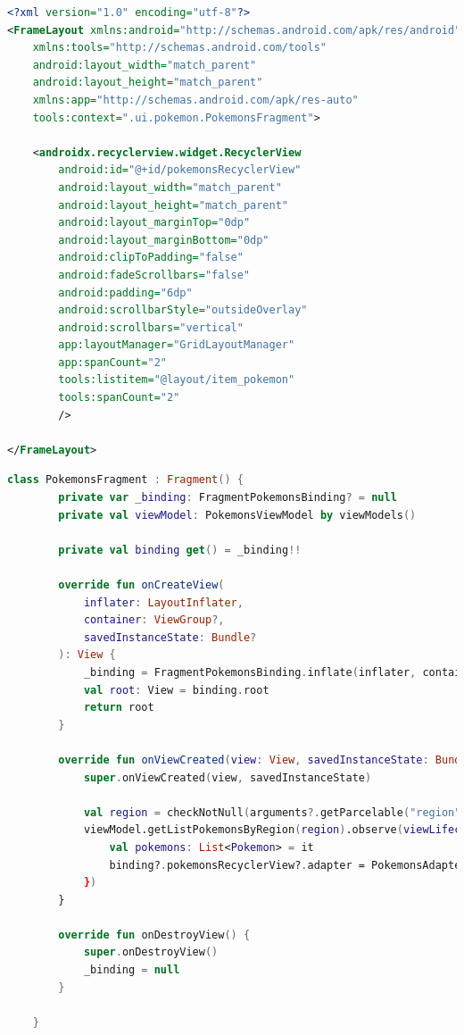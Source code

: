 \documentclass[a4paper, 12pt]{article}
\begin{document}
\begin{lstlisting}[caption={Pokemons Fragment Layout.}, label={code:xml_pokemons_fragment}, language=XML]
<?xml version="1.0" encoding="utf-8"?>
<FrameLayout xmlns:android="http://schemas.android.com/apk/res/android"
    xmlns:tools="http://schemas.android.com/tools"
    android:layout_width="match_parent"
    android:layout_height="match_parent"
    xmlns:app="http://schemas.android.com/apk/res-auto"
    tools:context=".ui.pokemon.PokemonsFragment">

    <androidx.recyclerview.widget.RecyclerView
        android:id="@+id/pokemonsRecyclerView"
        android:layout_width="match_parent"
        android:layout_height="match_parent"
        android:layout_marginTop="0dp"
        android:layout_marginBottom="0dp"
        android:clipToPadding="false"
        android:fadeScrollbars="false"
        android:padding="6dp"
        android:scrollbarStyle="outsideOverlay"
        android:scrollbars="vertical"
        app:layoutManager="GridLayoutManager"
        app:spanCount="2"
        tools:listitem="@layout/item_pokemon"
        tools:spanCount="2"
        />

</FrameLayout>
\end{lstlisting}


\begin{lstlisting}[caption={Pokemons Fragment code.}, label={code:code_pokemons_fragment}, language=Kotlin]
    class PokemonsFragment : Fragment() {
        private var _binding: FragmentPokemonsBinding? = null
        private val viewModel: PokemonsViewModel by viewModels()
    
        private val binding get() = _binding!!
    
        override fun onCreateView(
            inflater: LayoutInflater,
            container: ViewGroup?,
            savedInstanceState: Bundle?
        ): View {
            _binding = FragmentPokemonsBinding.inflate(inflater, container, false)
            val root: View = binding.root
            return root
        }
    
        override fun onViewCreated(view: View, savedInstanceState: Bundle?) {
            super.onViewCreated(view, savedInstanceState)
    
            val region = checkNotNull(arguments?.getParcelable("region", PokemonRegion::class.java))
            viewModel.getListPokemonsByRegion(region).observe(viewLifecycleOwner, Observer {
                val pokemons: List<Pokemon> = it
                binding?.pokemonsRecyclerView?.adapter = PokemonsAdapter(pokemons,view.context)
            })
        }
    
        override fun onDestroyView() {
            super.onDestroyView()
            _binding = null
        }
    
    }
\end{lstlisting}
\end{document}
